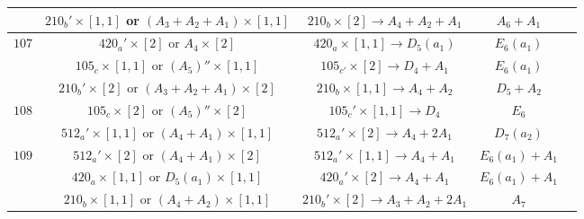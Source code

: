 \documentclass[reqno,12pt]{amsart}
\numberwithin{equation}{section}
\theoremstyle{plain}
\theoremstyle{definition}
\begin{document}
\begin{table}[htbp]
\begin{tabular}{|c|c|c|c|c|}
 &  $ 210_b'\times [1,1]$  or $(A_3+A_2+A_1)\times [1,1]$&    $210_b\times [2] \rightarrow A_4+A_2+A_1$     &   $ A_6+A_1$      \\
  \hline
$ 107$   
&  $ 420_a'\times [2]$ or $A_4\times [2]$&    $420_a\times [1,1] \rightarrow D_5(a_1)$  &   $ E_6(a_1)$      \\
&  $ 105_c\times [1,1]$ or $(A_5)''\times [1,1]$&    $105_{c'}\times [2] \rightarrow D_4+A_1$     &   $ E_6(a_1)$      \\

 &  $ 210_b'\times [2]$  or $(A_3+A_2+A_1)\times [2]$&    $210_b\times [1,1] \rightarrow A_4+A_2$     &   $ D_5+A_2$      \\
  \hline

$ 108$  
&  $ 105_c\times [2]$ or $(A_5)''\times [2]$&    $105_{c}'\times [1,1] \rightarrow D_4$     &   $ E_6$      \\
 &  $ 512_a'\times [1,1]$  or $(A_4+A_1)\times [1,1]$&    $512_a'\times [2] \rightarrow A_4+2A_1$     &   $ D_7(a_2)$      \\
  \hline

$ 109$  
 &  $ 512_a'\times [2]$  or $(A_4+A_1)\times [2]$&    $512_a'\times [1,1] \rightarrow A_4+A_1$     &   $ E_6(a_1)+A_1$      \\
 &  $ 420_a\times [1,1]$ or $D_5(a_1)\times [1,1]$&    $420_a'\times [2] \rightarrow A_4+A_1$     &   $ E_6(a_1)+A_1$      \\
 &  $ 210_b\times [1,1]$  or $(A_4+A_2)\times [1,1]$&    $210_b'\times [2] \rightarrow A_3+A_2+2A_1$     &   $ A_7$      \\
  \hline




	\end{tabular}
	\bigskip
	
\end{table}
\end{document}
